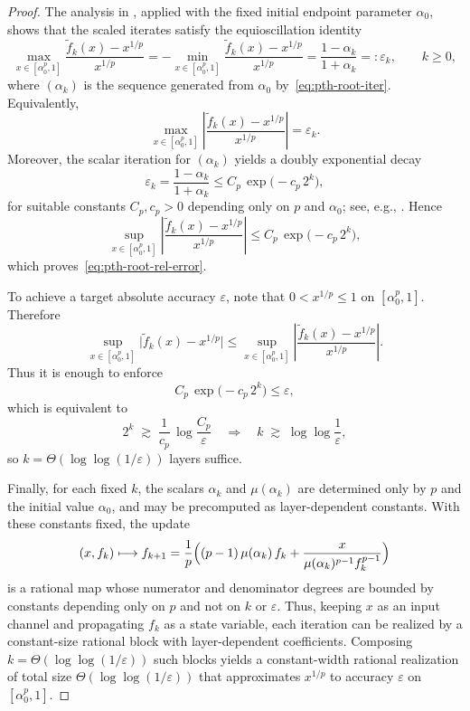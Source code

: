 \documentclass{article}
\theoremstyle{plain}
\theoremstyle{definition}
\theoremstyle{remark}
\begin{document}
\begin{proof}
The analysis in \citet{GAWLIK2021105577}, applied with the fixed initial endpoint parameter $\alpha_0$, shows that the scaled iterates satisfy the equioscillation identity
\[
\max_{x\in[\alpha_0^p,1]}
\frac{\tilde f_k(x)-x^{1/p}}{x^{1/p}}
=
-\min_{x\in[\alpha_0^p,1]}
\frac{\tilde f_k(x)-x^{1/p}}{x^{1/p}}
=
\frac{1-\alpha_k}{1+\alpha_k}
=:\varepsilon_k,
\qquad k\ge 0,
\]
where $(\alpha_k)$ is the sequence generated from $\alpha_0$ by~\cref{eq:pth-root-iter}. Equivalently,
\[
\max_{x\in[\alpha_0^p,1]}
\left|
\frac{\tilde f_k(x)-x^{1/p}}{x^{1/p}}
\right|
=
\varepsilon_k.
\]
Moreover, the scalar iteration for $(\alpha_k)$ yields a doubly exponential decay
\[
\varepsilon_k
=
\frac{1-\alpha_k}{1+\alpha_k}
\le
C_p\,\exp\!\bigl(-c_p\,2^k\bigr),
\]
for suitable constants $C_p,c_p>0$ depending only on $p$ and $\alpha_0$; see, e.g., \citet[Thm.~3.2]{GAWLIK2021105577}. Hence
\[
\sup_{x\in[\alpha_0^p,1]}
\left|
\frac{\tilde f_k(x)-x^{1/p}}{x^{1/p}}
\right|
\le
C_p\,\exp\!\bigl(-c_p\,2^k\bigr),
\]
which proves~\cref{eq:pth-root-rel-error}.

To achieve a target absolute accuracy $\varepsilon$, note that $0<x^{1/p}\le 1$ on $[\alpha_0^p,1]$. Therefore
\[
\sup_{x\in[\alpha_0^p,1]}
\bigl|\tilde f_k(x)-x^{1/p}\bigr|
\le
\sup_{x\in[\alpha_0^p,1]}
\left|
\frac{\tilde f_k(x)-x^{1/p}}{x^{1/p}}
\right|.
\]
Thus it is enough to enforce
\[
C_p\,\exp\!\bigl(-c_p\,2^k\bigr)\le \varepsilon,
\]
which is equivalent to
\[
2^k \;\gtrsim\; \frac{1}{c_p}\,\log\frac{C_p}{\varepsilon}
\quad\Longrightarrow\quad
k \;\gtrsim\; \log\log\frac{1}{\varepsilon},
\]
so $k=\Theta(\log\log(1/\varepsilon))$ layers suffice.

Finally, for each fixed $k$, the scalars $\alpha_k$ and $\mu(\alpha_k)$ are determined only by $p$ and the initial value $\alpha_0$, and may be precomputed as layer-dependent constants. With these constants fixed, the update
\[
(x,f_k)\longmapsto f_{k+1}
=
\frac{1}{p}\Bigl(
    (p-1)\,\mu(\alpha_k)\,f_k
    +
    \frac{x}{\mu(\alpha_k)^{p-1} f_k^{p-1}}
\Bigr)
\]
is a rational map whose numerator and denominator degrees are bounded by constants depending only on $p$ and not on $k$ or $\varepsilon$. Thus, keeping $x$ as an input channel and propagating $f_k$ as a state variable, each iteration can be realized by a constant-size rational block with layer-dependent coefficients. Composing $k=\Theta(\log\log(1/\varepsilon))$ such blocks yields a constant-width rational realization of total size $\Theta(\log\log(1/\varepsilon))$ that approximates $x^{1/p}$ to accuracy $\varepsilon$ on $[\alpha_0^p,1]$.
\end{proof}
\end{document}
